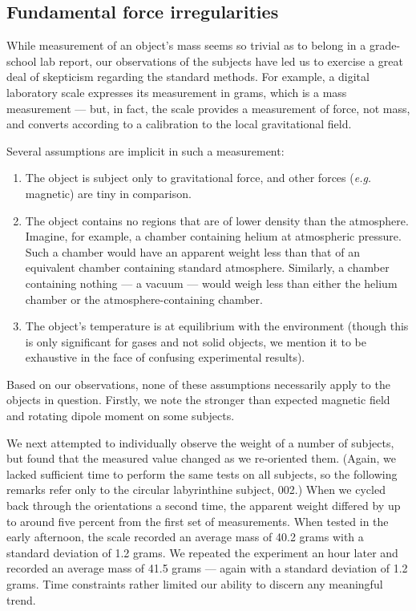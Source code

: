 \documentclass[10pt]{article}
\theoremstyle{definition}
\begin{document}
\subsection{Fundamental force irregularities}
While measurement of an object's mass seems so trivial as to belong in a grade-school lab report, our observations of the subjects have led us to exercise a great deal of skepticism regarding the standard methods.
For example, a digital laboratory scale expresses its measurement in grams, which is a mass measurement --- but, in fact, the scale provides a measurement of force, not mass, and converts according to a calibration to the local gravitational field.

Several assumptions are implicit in such a measurement:
\begin{enumerate}
\item The object is subject only to gravitational force, and other forces (\textit{e.g.} magnetic) are tiny in comparison.
\item The object contains no regions that are of lower density than the atmosphere. Imagine, for example, a chamber containing helium at atmospheric pressure. Such a chamber would have an apparent weight less than that of an equivalent chamber containing standard atmosphere. Similarly, a chamber containing nothing --- a vacuum --- would weigh less than either the helium chamber or the atmosphere-containing chamber.
\item The object's temperature is at equilibrium with the environment (though this is only significant for gases and not solid objects, we mention it to be exhaustive in the face of confusing experimental results).
\end{enumerate}

Based on our observations, none of these assumptions necessarily apply to the objects in question.
Firstly, we note the stronger than expected magnetic field and rotating dipole moment on some subjects.

We next attempted to individually observe the weight of a number of subjects, but found that the measured value changed as we re-oriented them.
(Again, we lacked sufficient time to perform the same tests on all subjects, so the following remarks refer only to the circular labyrinthine subject, 002.)
When we cycled back through the orientations a second time, the apparent weight differed by up to around five percent from the first set of measurements.
When tested in the early afternoon, the scale recorded an average mass of 40.2 grams with a standard deviation of 1.2 grams.
We repeated the experiment an hour later and recorded an average mass of 41.5 grams --- again with a standard deviation of 1.2 grams.
Time constraints rather limited our ability to discern any meaningful trend.
\end{document}
